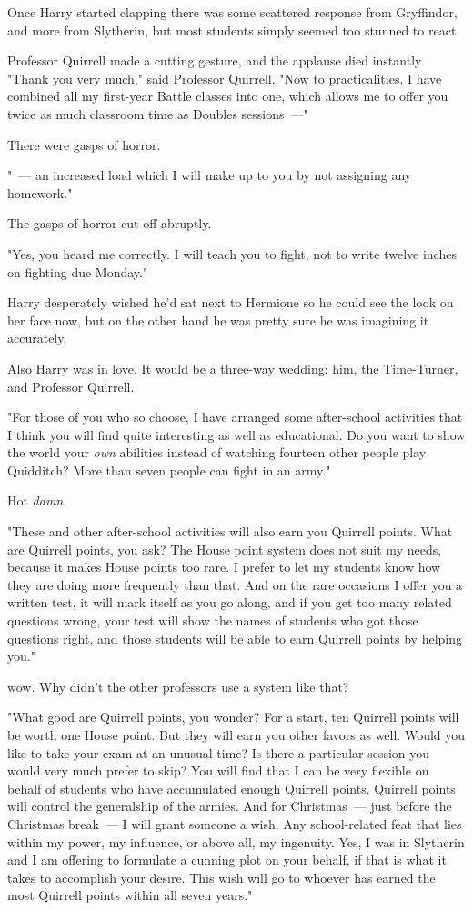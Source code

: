 Once Harry started clapping there was some scattered response from Gryffindor,
and more from Slytherin, but most students simply seemed too stunned to react.

Professor Quirrell made a cutting gesture, and the applause died instantly.
"Thank you very much," said Professor Quirrell. "Now to practicalities. I have
combined all my first-year Battle classes into one, which allows me to offer
you twice as much classroom time as Doubles sessions~---"

There were gasps of horror.

"~--- an increased load which I will make up to you by not assigning any
homework."

The gasps of horror cut off abruptly.

"Yes, you heard me correctly. I will teach you to fight, not to write twelve
inches on fighting due Monday."

Harry desperately wished he'd sat next to Hermione so he could see the look on
her face now, but on the other hand he was pretty sure he was imagining it
accurately.

Also Harry was in love. It would be a three-way wedding: him, the Time-Turner,
and Professor Quirrell.

"For those of you who so choose, I have arranged some after-school activities
that I think you will find quite interesting as well as educational. Do you
want to show the world your \emph{own} abilities instead of watching fourteen
other people play Quidditch? More than seven people can fight in an army."

Hot \emph{damn.}

"These and other after-school activities will also earn you Quirrell points.
What are Quirrell points, you ask? The House point system does not suit my
needs, because it makes House points too rare. I prefer to let my students know
how they are doing more frequently than that. And on the rare occasions I offer
you a written test, it will mark itself as you go along, and if you get too
many related questions wrong, your test will show the names of students who got
those questions right, and those students will be able to earn Quirrell points
by helping you."

{\el} wow. Why didn't the other professors use a system like that?

"What good are Quirrell points, you wonder? For a start, ten Quirrell points
will be worth one House point. But they will earn you other favors as well.
Would you like to take your exam at an unusual time? Is there a particular
session you would very much prefer to skip? You will find that I can be very
flexible on behalf of students who have accumulated enough Quirrell points.
Quirrell points will control the generalship of the armies. And for
Christmas~--- just before the Christmas break~--- I will grant someone a wish. Any
school-related feat that lies within my power, my influence, or above all, my
ingenuity. Yes, I was in Slytherin and I am offering to formulate a cunning
plot on your behalf, if that is what it takes to accomplish your desire. This
wish will go to whoever has earned the most Quirrell points within all seven
years."

